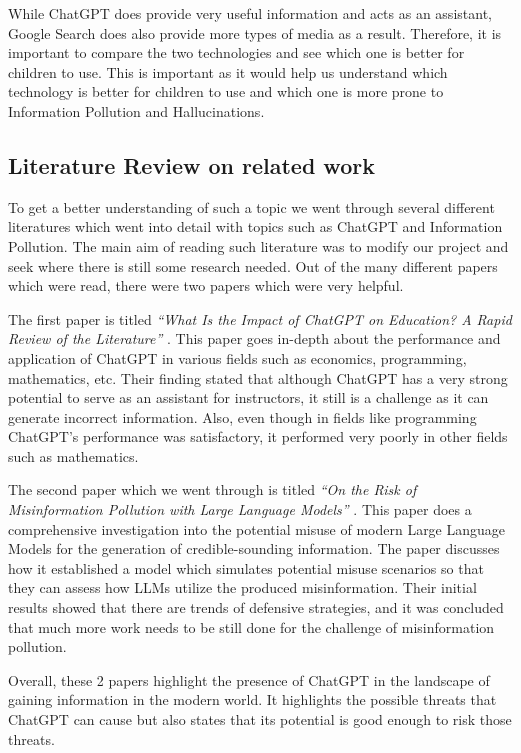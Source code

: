 \documentclass[50pt]{usiinfbachelorproject}
\begin{document}
While ChatGPT does provide very useful information and acts as an assistant, Google Search does also provide more types of media as a result. Therefore, it is important to compare the two technologies and see which one is better for children to use. This is important as it would help us understand which technology is better for children to use and which one is more prone to Information Pollution and Hallucinations.

\subsection{Literature Review on related work}
To get a better understanding of such a topic we went through several different literatures which went into detail with topics such as ChatGPT and Information Pollution. The main aim of reading such literature was to modify our project and seek where there is still some research needed. Out of the many different papers which were read, there were two papers which were very helpful.

The first paper is titled \textit{“What Is the Impact of ChatGPT on Education? A Rapid Review of the Literature”} \cite{lo2023impact}. This paper goes in-depth about the performance and application of ChatGPT in various fields such as economics, programming, mathematics, etc. Their finding stated that although ChatGPT has a very strong potential to serve as an assistant for instructors, it still is a challenge as it can generate incorrect information. Also, even though in fields like programming ChatGPT’s performance was satisfactory, it performed very poorly in other fields such as mathematics.  

The second paper which we went through is titled \textit{“On the Risk of Misinformation Pollution with Large Language Models”} \cite{pan2023risk}. This paper does a comprehensive investigation into the potential misuse of modern Large Language Models for the generation of credible-sounding information. The paper discusses how it established a model which simulates potential misuse scenarios so that they can assess how LLMs utilize the produced misinformation. Their initial results showed that there are trends of defensive strategies, and it was concluded that much more work needs to be still done for the challenge of misinformation pollution. 

Overall, these 2 papers highlight the presence of ChatGPT in the landscape of gaining information in the modern world. It highlights the possible threats that ChatGPT can cause but also states that its potential is good enough to risk those threats. 
\end{document}
